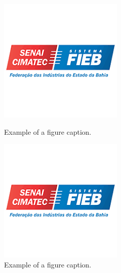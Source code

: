 \begin{figure}[H]
   \centering
   \begin{minipage}{.5\textwidth}
       \centering
       \includegraphics[width=0.5\linewidth, height=0.15\textheight]{images/fig-senai.png}
       \caption{Example of a figure caption.}
       \label{fig:prob1_6_2}
   \end{minipage}%
   \begin{minipage}{0.5\textwidth}
       \centering
       \includegraphics[width=0.5\linewidth, height=0.15\textheight]{images/fig-senai.png}
       \caption{Example of a figure caption.}
       \label{fig:prob1_6_1}
   \end{minipage}
   \begin{minipage}{.5\textwidth}
      \centering

\end{minipage}
\end{figure}
